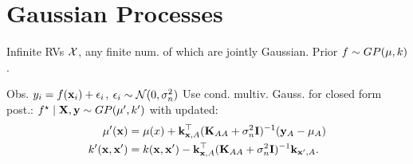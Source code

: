 \section{Gaussian Processes}

\begin{definition}[GP]
    Infinite RVs \(\operatorname{\mathcal{X}}\), any finite num. of which are jointly Gaussian. Prior \(f \sim GP(\mu, k)\).

\end{definition}



\begin{definition}[Inference]
    Obs. \(y_i = f(\vb{x}_i) + \epsilon_i\), \(\epsilon_i \sim \operatorname{\mathcal{N}}(0, \sigma_n^2)\)
    Use {\color{H3} cond. multiv. Gauss.} for closed form post.:
    \(f^\star \mid \vb{X}, \vb{y} \sim GP(\mu', k')\) with updated:
    \begin{align*}
        \mu'(\vb{x}) &= \mu(x) + \vb{k}_{\vb{x}, A}^\top(\vb{K}_{AA} + \sigma_n^2\vb{I})^{-1}(\vb{y}_A - \mu_A) \\
        k'(\vb{x}, \vb{x}') &= k(\vb{x}, \vb{x}') - \vb{k}_{\vb{x}, A}^\top (\vb{K}_{AA} + \sigma_n^2\vb{I})^{-1}\vb{k}_{\vb{x}', A}.
    \end{align*}
\end{definition}

